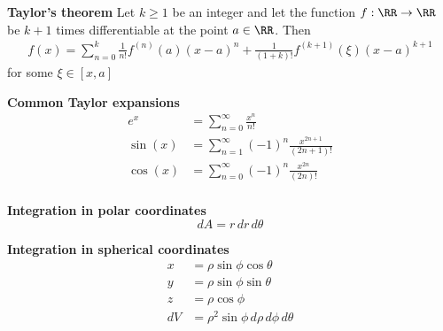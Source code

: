 \textbf{Taylor's theorem} \newline
Let \(k\geq1\) be an integer and let the function \(f:\RR \rightarrow \RR\) be \(k+1\) times differentiable at the point \(a\in\RR\). Then
\begin{align*}
    f(x) = \sum_{n=0}^{k}\frac{1}{n!}f^{(n)}(a)(x-a)^n + \frac{1}{(1+k)!}f^{(k+1)}(\xi)(x-a)^{k+1}
\end{align*}
for some \(\xi\in[x,a]\)


\textbf{Common Taylor expansions}
\begin{align*}
    e^x &= \sum_{n=0}^{\infty}\frac{x^n}{n!} \\
    \sin(x) &= \sum_{n=1}^{\infty}(-1)^n\frac{x^{2n+1}}{(2n+1)!} \\
    \cos(x) &= \sum_{n=0}^{\infty}(-1)^n\frac{x^{2n}}{(2n)!} \\
\end{align*}

\textbf{Integration in polar coordinates}
\[dA = r\,dr\,d\theta\]

\textbf{Integration in spherical coordinates}
\begin{align*}
    x & = \rho \sin \phi \cos \theta \\
    y & = \rho \sin \phi \sin \theta \\
    z & = \rho \cos \phi \\
    dV &= \rho^2 \sin \phi \, d\rho \, d\phi \, d\theta
\end{align*}
